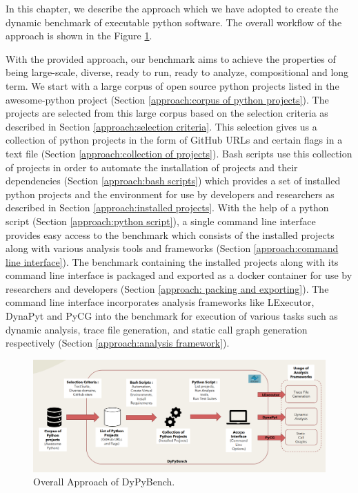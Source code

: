 In this chapter, we describe the approach which we have adopted to create the dynamic benchmark of executable python software. The overall workflow of the approach is shown in the Figure \ref{fig:overall_approach}.

With the provided approach, our benchmark aims to achieve the properties of being large-scale, diverse, ready to run, ready to analyze, compositional and long term. We start with a large corpus of open source python projects listed in the awesome-python project (Section \ref{approach:corpus of python projects}). The projects are selected from this large corpus based on the selection criteria as described in Section \ref{approach:selection criteria}. This selection gives us a collection of python projects in the form of GitHub URLs and certain flags in a text file (Section \ref{approach:collection of projects}). Bash scripts use this collection of projects in order to automate the installation of projects and their dependencies (Section \ref{approach:bash scripts}) which provides a set of installed python projects and the environment for use by developers and researchers as described in Section \ref{approach:installed projects}. With the help of a python script (Section \ref{approach:python script}), a single command line interface provides easy access to the benchmark which consists of the installed projects along with various analysis tools and frameworks (Section \ref{approach:command line interface}). The benchmark containing the installed projects along with its command line interface is packaged and exported as a docker container for use by researchers and developers (Section \ref{approach: packing and exporting}). The command line interface incorporates  analysis frameworks like LExecutor, DynaPyt and PyCG into the benchmark for execution of various tasks such as dynamic analysis, trace file generation, and static call graph generation respectively (Section \ref{approach:analysis framework}).

\begin{figure}[ht]
\centering
\includegraphics[width=1\linewidth]{figures/approach/DyPyBench.png}
\caption[Approach]{\label{fig:overall_approach}Overall Approach of DyPyBench.}
\end{figure}

